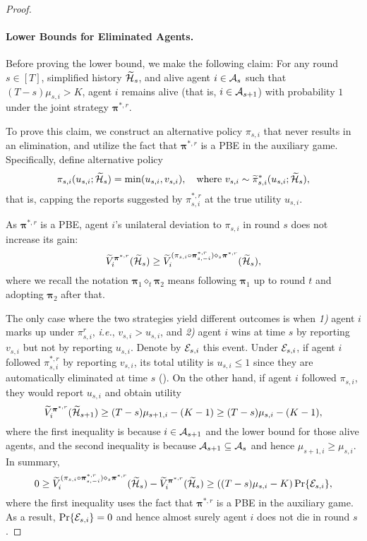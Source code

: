 \begin{proof}
\paragraph{Lower Bounds for Eliminated Agents.}
Before proving the lower bound, we make the following claim: For any round $s\in[T]$, simplified history $\widetilde{\mathcal{H}}_s$, and alive agent $i\in\mathcal{A}_s$ such that $(T-s)\mu_{s,i} > K$, agent $i$ remains alive (that is, $i\in \mathcal{A}_{s+1}$) with probability $1$ under the joint strategy ${\bm \pi}^{\ast,r}$.

To prove this claim, we construct an alternative policy $\pi_{s,i}$ that never results in an elimination, and utilize the fact that ${\bm \pi}^{\ast,r}$ is a PBE in the auxiliary game. Specifically, define alternative policy
\begin{equation*}
\pi_{s,i}(u_{s,i};\widetilde {\mathcal{H}}_s)=\min(u_{s,i},v_{s,i}),\quad \text{where }v_{s,i}\sim \widetilde{\pi}_{s,i}^\ast (u_{s,i};\widetilde {\mathcal{H}}_s),
\end{equation*}
that is, capping the reports suggested by $\pi_{s,i}^{\ast,r}$ at the true utility $u_{s,i}$.

As ${\bm \pi}^{\ast,r}$ is a PBE, agent $i$'s unilateral deviation to $\pi_{s,i}$ in round $s$ does not increase its gain:
\begin{equation*}
\widetilde V_i^{{\bm \pi}^{\ast,r}}(\widetilde{\mathcal{H}}_s)\ge \widetilde V_i^{(\pi_{s,i}\circ {\bm \pi}_{s,-i}^{\ast,r})\diamond_s {\bm \pi}^{\ast,r}}(\widetilde {\mathcal{H}}_s),
\end{equation*}
where we recall the notation $\bm \pi_1 \diamond_t \bm \pi_2$ means following $\bm \pi_1$ up to round $t$ and adopting $\bm \pi_2$ after that.

The only case where the two strategies yield different outcomes is when \textit{1)} agent $i$ marks up under $\pi^r_{s,i}$, \textit{i.e.}, $v_{s,i}>u_{s,i}$, and \textit{2)} agent $i$ wins at time $s$ by reporting $v_{s,i}$ but not by reporting $u_{s,i}$. Denote by $\mathcal{E}_{s,i}$ this event. Under $\mathcal{E}_{s,i}$, if agent $i$ followed $\pi_{s,i}^{\ast,r}$ by reporting $v_{s,i}$, its total utility is $u_{s,i}\leq 1$ since they are automatically eliminated at time $s$ (). On the other hand, if agent $i$ followed $\pi_{s,i}$, they would report $u_{s,i}$ and obtain utility
\begin{equation*}
\widetilde V_i^{{\bm \pi}^{\ast,r}}(\widetilde {\mathcal{H}}_{s+1})\geq (T-s)\mu_{s+1,i}-(K-1)\ge (T-s)\mu_{s,i}-(K-1),
\end{equation*}
where the first inequality is because $i\in \mathcal{A}_{s+1}$ and the lower bound  for those alive agents, and the second inequality is because $\mathcal{A}_{s+1}\subseteq \mathcal{A}_s$ and hence $\mu_{s+1,i}\ge \mu_{s,i}$. In summary,
\begin{equation*}
0\geq \widetilde V_i^{(\pi_{s,i}\circ {\bm \pi}_{s,-i}^{\ast,r})\diamond_s {\bm \pi}^{\ast,r}}(\widetilde {\mathcal{H}}_s) - \widetilde V_i^{{\bm \pi}^{\ast,r}}(\widetilde {\mathcal{H}}_{s}) \geq ((T-s)\mu_{s,i}-K)\Pr \{\mathcal{E}_{s,i}\},
\end{equation*}
where the first inequality uses the fact that ${\bm \pi}^{\ast,r}$ is a PBE in the auxiliary game. As a result, $\Pr\{\mathcal{E}_{s,i}\}=0$ and hence almost surely agent $i$ does not die in round $s$.


\end{proof}
